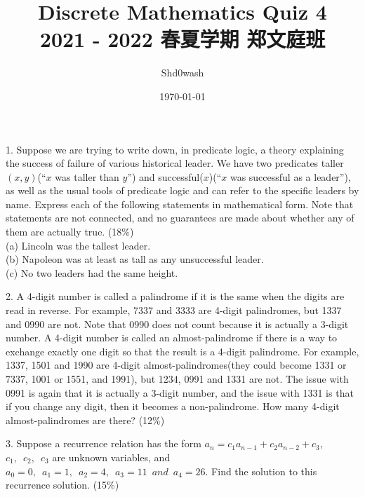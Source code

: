 \documentclass{article}
\title{Discrete Mathematics Quiz 4\\\small{2021 - 2022 \enspace 春夏学期 \enspace 郑文庭班}}
\author{Shd0wash}
\date{\today}
\begin{document}
\maketitle

1. Suppose we are trying to write down, in predicate logic, a theory explaining the success of failure of various historical leader. We have two predicates 
taller$(x,y)$(``$x$ was taller than $y$'') and successful($x$)(``$x$ was successful as a leader''), as well as the usual tools of predicate logic and can refer to 
the specific leaders by name. Express each of the following statements in mathematical form. Note that statements are not connected, and no guarantees are 
made about whether any of them are actually true. (18\%)\\
(a) Lincoln was the tallest leader.\\
(b) Napoleon was at least as tall as any unsuccessful leader.\\
(c) No two leaders had the same height.

2. A 4-digit number is called a palindrome if it is the same when the digits are read in reverse. For example, 7337 and 3333 are 4-digit palindromes, but 1337 
and 0990 are not. Note that 0990 does not count because it is actually a 3-digit number. A 4-digit number is called an almost-palindrome if there is a way to 
exchange exactly one digit so that the result is a 4-digit palindrome. For example, 1337, 1501 and 1990 are 4-digit almost-palindromes(they could become 1331 
or 7337, 1001 or 1551, and 1991), but 1234, 0991 and 1331 are not. The issue with 0991 is again that it is actually a 3-digit number, and the issue with 1331 
is that if you change any digit, then it becomes a non-palindrome. How many 4-digit almost-palindromes are there? (12\%)

3. Suppose a recurrence relation has the form  $a_{n} = c_{1}a_{n-1} + c_{2}a_{n-2} + c_{3}$, $c_{1}, \enspace c_{2}, \enspace c_{3}$ are unknown variables, 
and $a_{0} = 0, \enspace a_{1} = 1, \enspace a_{2} = 4, \enspace a_{3} = 11 \enspace and \enspace a_{4} = 26$. Find the solution to this recurrence solution. 
(15\%)

\clearpage
\end{document}

